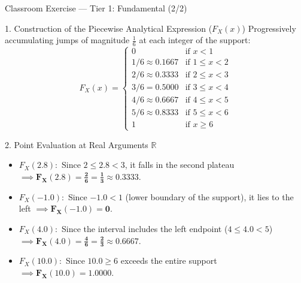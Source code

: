 \documentclass[aspectratio=169,xcolor={dvipsnames,table}]{beamer}
\begin{document}
\begin{frame}{Classroom Exercise --- Tier 1: Fundamental (2/2)}
	\fontsize{6.8pt}{8.2pt}\selectfont
	\begin{block}{1. Construction of the Piecewise Analytical Expression ($F_X(x)$)}
		\fontsize{6.8pt}{8.2pt}\selectfont
		Progressively accumulating jumps of magnitude $\frac{1}{6}$ at each integer of the support:
		$$F_X(x) = \begin{cases}
			0 & \text{if } x < 1 \\
			1/6 \approx 0.1667 & \text{if } 1 \le x < 2 \\
			2/6 \approx 0.3333 & \text{if } 2 \le x < 3 \\
			3/6 = 0.5000 & \text{if } 3 \le x < 4 \\
			4/6 \approx 0.6667 & \text{if } 4 \le x < 5 \\
			5/6 \approx 0.8333 & \text{if } 5 \le x < 6 \\
			1 & \text{if } x \ge 6
		\end{cases}$$
	\end{block}
	\vspace{-0.15cm}
	\pause
	\begin{alertblock}{2. Point Evaluation at Real Arguments $\mathbb{R}$}
		\fontsize{6.8pt}{8.2pt}\selectfont
		\begin{itemize}\itemsep=0.06cm
			\item $F_X(2.8):$ Since $2 \le 2.8 < 3$, it falls in the second plateau $\implies \mathbf{F_X(2.8) = \frac{2}{6} = \frac{1}{3} \approx 0.3333}$.
			\item $F_X(-1.0):$ Since $-1.0 < 1$ (lower boundary of the support), it lies to the left $\implies \mathbf{F_X(-1.0) = 0}$.
			\item $F_X(4.0):$ Since the interval includes the left endpoint ($4 \le 4.0 < 5$) $\implies \mathbf{F_X(4.0) = \frac{4}{6} = \frac{2}{3} \approx 0.6667}$.
			\item $F_X(10.0):$ Since $10.0 \ge 6$ exceeds the entire support $\implies \mathbf{F_X(10.0) = 1.0000}$.
		\end{itemize}
	\end{alertblock}
\end{frame}
\end{document}
